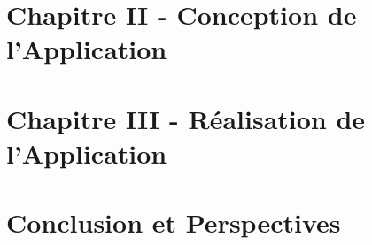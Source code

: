 \documentclass[a4paper,11pt,oneside]{report}
\begin{document}
\newpage

\chapter{Chapitre II - Conception de l'Application}

\newpage



\newpage

\chapter{Chapitre III - Réalisation de l'Application}

\newpage



\newpage

\chapter{Conclusion et Perspectives}

\newpage

\renewcommand{\appendixtocname}{Annexes}







\newpage
\end{document}
